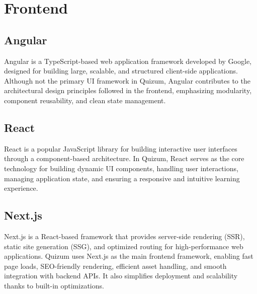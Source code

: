 \section{Frontend}
\subsection{Angular}
Angular is a TypeScript-based web application framework developed by Google, designed for building large, scalable, and structured client-side applications. Although not the primary UI framework in Quizum, Angular contributes to the architectural design principles followed in the frontend, emphasizing modularity, component reusability, and clean state management.

\subsection{React}
React is a popular JavaScript library for building interactive user interfaces through a component-based architecture. In Quizum, React serves as the core technology for building dynamic UI components, handling user interactions, managing application state, and ensuring a responsive and intuitive learning experience.

\subsection{Next.js}
Next.js is a React-based framework that provides server-side rendering (SSR), static site generation (SSG), and optimized routing for high-performance web applications. Quizum uses Next.js as the main frontend framework, enabling fast page loads, SEO-friendly rendering, efficient asset handling, and smooth integration with backend APIs. It also simplifies deployment and scalability thanks to built-in optimizations.